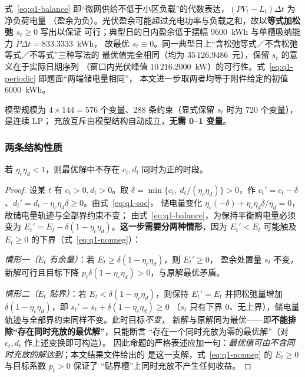 式~\eqref{eq:q1-balance} 即“微网供给不低于小区负载”的代数表达，\((PV_t-L_t)\Delta t\) 为净负荷电量
（盈余为负）。光伏盈余可能超过充电功率与负载之和，故以\textbf{等式加松弛 \(s_t\ge0\)} 写出以保证
可行；典型日的日内盈余低于摆幅 9600~kWh 与单槽吸纳能力 \(\overline P\Delta t=833.3333\)~kWh，
故最优 \(s_t\equiv0\)。同一典型日上“含松弛等式／不含松弛等式／不等式”三种写法的
最优值完全相同（均为 \(35\,126.9486\)~元），保留 \(s_t\) 的意义在于实际日期序列
（窗口内光伏峰值 \(10\,216.2000\)~kW）的可行性。式~\eqref{eq:q1-periodic} 即题面“两端储电量相同”，
本文进一步取两者均等于附件给定的初值 6000~kWh。

模型规模为 \(4\times144=576\) 个变量、288 条约束（显式保留 \(s_t\) 时为 720 个变量），是连续 LP；
充放互斥由模型结构自动成立，\textbf{无需 0--1 变量}。

\subsubsection{两条结构性质}

\begin{proposition}[充放互斥]\label{prop:no-simul}
若 \(\eta_c\eta_d<1\)，则最优解中不存在 \(c_t,d_t\) 同时为正的时段。
\end{proposition}

\begin{proof}
设某 \(t\) 有 \(c_t>0,d_t>0\)。取 \(\delta=\min\{c_t,\ d_t/(\eta_c\eta_d)\}>0\)，作
\(c_t'=c_t-\delta\)、\(d_t'=d_t-\eta_c\eta_d\delta\ge0\)。由式~\eqref{eq:q1-soc}，
储电量变化 \(\eta_c(-\delta)+\eta_c\eta_d\delta/\eta_d=0\)，故储电量轨迹与全部界约束不变；
由式~\eqref{eq:q1-balance}，为保持平衡购电量必须变为
\(E_t'=E_t-\delta(1-\eta_c\eta_d)\)。\textbf{这一步需要分两种情形}，因为
\(E_t'<E_t\) 可能触及 \(E_t\ge0\) 的下界（式~\eqref{eq:q1-nonneg}）：

\emph{情形一（\(E_t\) 有余量）}：若 \(E_t\ge\delta(1-\eta_c\eta_d)\)，则 \(E_t'\ge0\)，
盈余处置量 \(s_t\) 不变，新解可行且目标下降
\(p_t\delta(1-\eta_c\eta_d)>0\)，与原解最优矛盾。

\emph{情形二（\(E_t\) 贴界）}：若 \(E_t<\delta(1-\eta_c\eta_d)\)，则保持 \(E_t'=E_t\)
并把松弛量增加 \(\delta(1-\eta_c\eta_d)\)，即 \(s_t'=s_t+\delta(1-\eta_c\eta_d)\ge0\)
（\(s_t\) 只有下界 \(0\)、无上界），储电量轨迹与全部界约束同样不变。此时目标\emph{不变}，
新解与原解同为最优——即\textbf{不能排除“存在同时充放的最优解”}，只能断言
“存在一个同时充放为零的最优解”（对 \(c_t,d_t\) 作上述变换即可构造）。
因此命题的严格表述应加一句：\emph{最优值可由不含同时充放的解达到}；本文结果文件给出的
是这一支解，式~\eqref{eq:q1-nonneg} 的 \(E_t\ge0\) 与目标系数 \(p_t>0\) 保证了
“贴界槽”上同时充放不产生任何收益。
\end{proof}

